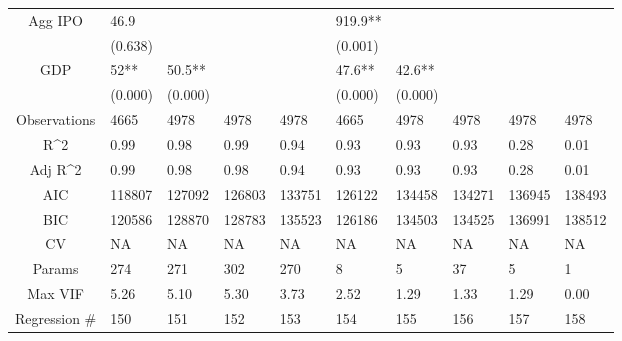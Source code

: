 \documentclass{article}
\begin{document}
\begin{table}[H]
\begin{tabular}{|clllllllll|}
  Agg IPO & 46.9 &  &  &  & 919.9** &  &  &  &  \\ 
   & (0.638) &  &  &  & (0.001) &  &  &  &  \\ 
  GDP & 52** & 50.5** &  &  & 47.6** & 42.6** &  &  &  \\ 
   & (0.000) & (0.000) &  &  & (0.000) & (0.000) &  &  &  \\ 
  \hline 
 Observations & 4665 & 4978 & 4978 & 4978 & 4665 & 4978 & 4978 & 4978 & 4978 \\ 
  R^2 & 0.99 & 0.98 & 0.99 & 0.94 & 0.93 & 0.93 & 0.93 & 0.28 & 0.01 \\ 
  Adj R^2 & 0.99 & 0.98 & 0.98 & 0.94 & 0.93 & 0.93 & 0.93 & 0.28 & 0.01 \\ 
  AIC & 118807 & 127092 & 126803 & 133751 & 126122 & 134458 & 134271 & 136945 & 138493 \\ 
  BIC & 120586 & 128870 & 128783 & 135523 & 126186 & 134503 & 134525 & 136991 & 138512 \\ 
  CV & NA & NA & NA & NA & NA & NA & NA & NA & NA \\ 
  Params & 274 & 271 & 302 & 270 & 8 & 5 & 37 & 5 & 1 \\ 
  Max VIF & 5.26 & 5.10 & 5.30 & 3.73 & 2.52 & 1.29 & 1.33 & 1.29 & 0.00 \\ 
  Regression \# & 150 & 151 & 152 & 153 & 154 & 155 & 156 & 157 & 158 \\ 
   \hline
\end{tabular}
 
\end{table}
\end{document}
